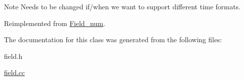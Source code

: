 \begin{DoxyNote}{Note}
Needs to be changed if/when we want to support different time formats. 
\end{DoxyNote}


Reimplemented from \mbox{\hyperlink{classField__num_ab573b6e30982c3d517794503f14560de}{Field\+\_\+num}}.



The documentation for this class was generated from the following files\+:\begin{DoxyCompactItemize}
\item 
field.\+h\item 
\mbox{\hyperlink{field_8cc}{field.\+cc}}\end{DoxyCompactItemize}

